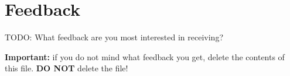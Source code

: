 
\chapter{Feedback}

TODO: What feedback are you most interested in receiving?

\textbf{Important:} if you do not mind what feedback you get, delete the contents of this file. \textbf{DO NOT} delete the file!